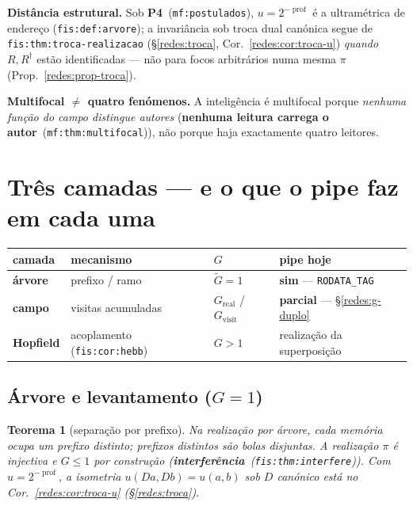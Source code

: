 \documentclass[11pt,a4paper]{article}
\newcommand{\code}[1]{\texttt{\small #1}}
\newcommand{\fis}[2]{\textbf{#2}~\textnormal{(\code{#1})}}
\newcommand{\mf}[2]{\textbf{#2}~\textnormal{(\code{mf:#1})}}
\newtheorem{teorema}{Teorema}
\begin{document}
\medskip\noindent\textbf{Distância estrutural.} Sob \mf{postulados}{P4},
$u=2^{-\operatorname{prof}}$ é a ultramétrica de endereço
(\code{fis:def:arvore}); a invariância sob troca dual canónica segue de
\code{fis:thm:troca-realizacao} (§\ref{redes:troca}, Cor.~\ref{redes:cor:troca-u})
\emph{quando} $R,R^{\dagger}$ estão identificadas --- não para focos arbitrários
numa mesma $\pi$ (Prop.~\ref{redes:prop-troca}).

\medskip\noindent\textbf{Multifocal $\neq$ quatro fenómenos.} A inteligência é
multifocal porque \emph{nenhuma função do campo distingue autores}
(\mf{thm:multifocal}{nenhuma leitura carrega o autor}), não porque haja exactamente
quatro leitores.

\section{Três camadas --- e o que o pipe faz em cada uma}\label{redes:camadas}

\begin{center}\small
\begin{tabular}{@{}llll@{}}
\toprule
camada & mecanismo & $G$ & pipe hoje \\
\midrule
\textbf{árvore} & prefixo / ramo & $\tilde G=1$ & \textbf{sim} --- \code{RODATA\_TAG} \\
\textbf{campo} & visitas acumuladas & $G_{\mathrm{real}}$ / $G_{\mathrm{visit}}$ & \textbf{parcial} --- §\ref{redes:g-duplo} \\
\textbf{Hopfield} & acoplamento (\code{fis:cor:hebb}) & $G>1$ & realização da superposição \\
\bottomrule
\end{tabular}
\end{center}

\subsection{Árvore e levantamento ($G=1$)}

\begin{teorema}[separação por prefixo]\label{redes:thm-arvore}
Na realização por árvore, cada memória ocupa um prefixo distinto; prefixos
distintos são bolas disjuntas. A realização $\pi$ é injectiva e $G\le1$ por
construção (\fis{fis:thm:interfere}{interferência}). Com
$u=2^{-\operatorname{prof}}$, a isometria $u(Da,Db)=u(a,b)$ sob $D$ canónico está
no Cor.~\ref{redes:cor:troca-u} (§\ref{redes:troca}).
\end{teorema}
\end{document}
